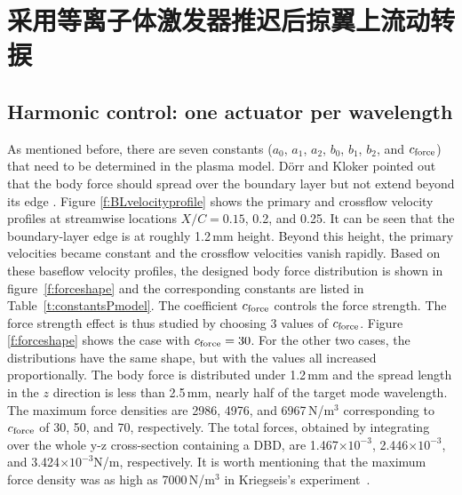 \section{采用等离子体激发器推迟后掠翼上流动转捩}

\subsection{Harmonic control: one actuator per wavelength}\label{subs:control1}
As mentioned before, there are seven constants ($a_0$, $a_1$, $a_2$, $b_0$, $b_1$, $b_2$, and $c_{\rm force}$) that need to be determined in the plasma model. D\"orr and Kloker pointed out that the body force should spread over the boundary layer but  not extend beyond its edge \cite{dorr2015stabilisation}. Figure \ref{f:BLvelocityprofile} shows the primary  and  crossflow velocity profiles at streamwise locations $X/C=0.15$, 0.2, and 0.25. It can be seen that the boundary-layer edge is at roughly  1.2\,mm height. Beyond this height, the primary velocities became constant and the crossflow velocities vanish rapidly. Based on these baseflow velocity profiles, the designed body force distribution is shown in figure~\ref{f:forceshape} and the corresponding constants are listed in Table~\ref{t:constantsPmodel}. The coefficient $c_{\rm force}$ controls the force strength. The force strength effect is thus studied by choosing 3 values of $c_{\rm force}$. Figure \ref{f:forceshape}  shows the case with $c_{\rm force}=30$. For the other two cases, the distributions have the same shape, but with the values  all increased proportionally. The body force is distributed under 1.2\,mm and the spread length in the $z$ direction is less than 2.5\,mm, nearly  half of the target mode wavelength. The maximum force densities are 2986, 4976, and 6967\,N/m$^3$ corresponding to $c_{\rm force}$ of 30, 50, and 70, respectively. The total forces, obtained by integrating over the whole y-z cross-section containing a DBD, are 1.467$\times 10^{-3}$, 2.446$\times 10^{-3}$, and 3.424$\times 10^{-3}$N/m, respectively. It is worth mentioning that the maximum force density was as high as 7000\,N/m$^3$ in Kriegseis's experiment~\cite{kriegseis2013velocity}.

